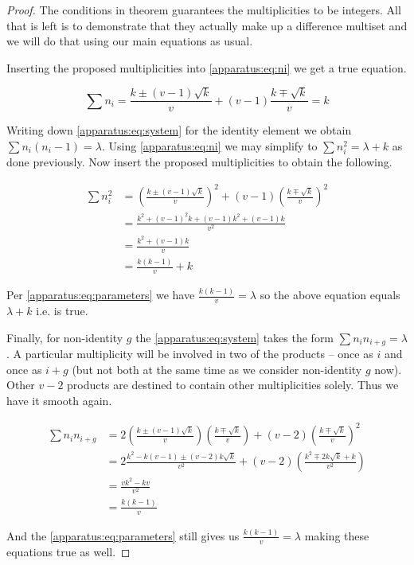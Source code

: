 \documentclass{article}
\theoremstyle{plain}
\theoremstyle{definition}
\theoremstyle{remark}
\begin{document}
		\begin{proof}
			The conditions in theorem guarantees the multiplicities to be integers. All that is left is to demonstrate that they actually make up a difference multiset and we will do that using our main equations as usual.
		
			Inserting the proposed multiplicities into \eqref{apparatus:eq:ni} we get a true equation.
			
			\begin{equation}
				\sum n_i = \frac{k \pm (v-1)\sqrt k}{v} + (v-1)\frac{k \mp \sqrt k}{v} = k
			\end{equation}
			
			Writing down \eqref{apparatus:eq:system} for the identity element we obtain $\sum n_i (n_i-1)=\lambda$. Using \eqref{apparatus:eq:ni} we may simplify to $\sum n_i^2 = \lambda + k$ as done previously. Now insert the proposed multiplicities to obtain the following.
			
			\begin{equation}
				\begin{split}
					\sum n_i^2  & = \left( \frac{k \pm (v-1)\sqrt k}{v} \right)^2 + (v-1) \left( \frac{k \mp \sqrt k}{v} \right)^2 \\
								& = \frac{k^2 + (v-1)^2 k + (v-1) k^2 + (v-1) k}{v^2} \\
								& = \frac{k^2 + (v-1) k}{v} \\
								& = \frac{k(k-1)}{v} + k
				\end{split}
			\end{equation}
			
			Per \eqref{apparatus:eq:parameters} we have $\frac{k(k-1)}{v} = \lambda$ so the above equation equals $\lambda + k$ i.e. is true.
			
			Finally, for non-identity $g$ the \eqref{apparatus:eq:system} takes the form $\sum n_i n_{i+g} = \lambda$. A particular multiplicity will be involved in two of the products -- once as $i$ and once as $i+g$ (but not both at the same time as we consider non-identity $g$ now). Other $v-2$ products are destined to contain other multiplicities solely. Thus we have it smooth again.
			
			\begin{equation}
				\begin{split}
					\sum n_i n_{i+g} & = 2 \left( \frac{k \pm (v-1)\sqrt k}{v} \right) 
											\left( \frac{k \mp \sqrt k}{v} \right) 
										+ (v-2) \left( \frac{k \mp \sqrt k}{v} \right)^2 \\
									 & = 2\frac{k^2 - k(v-1) \pm (v-2) k \sqrt k}{v^2} 
										+ (v-2) \left( \frac{k^2 \mp 2k\sqrt k + k}{v^2} \right) \\
									 & = \frac{v k^2 - kv}{v^2} \\
									 & = \frac{k(k-1)}{v}
				\end{split}
			\end{equation}
			
			And the \eqref{apparatus:eq:parameters} still gives us $\frac{k(k-1)}{v} = \lambda$ making these equations true as well.
		\end{proof}
	
\end{document}
